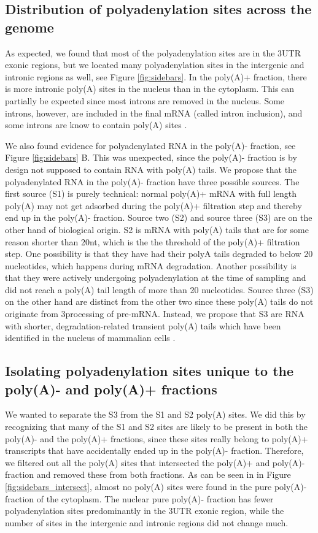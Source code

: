 \subsection{Distribution of polyadenylation sites across the genome}
As expected, we found that most of the polyadenylation sites are in the 3\p UTR
exonic regions, but we located many polyadenylation sites in the intergenic
and intronic regions as well, see Figure \ref{fig:sidebars}. In the poly(A)+
fraction, there is more intronic poly(A) sites in the nucleus than in the
cytoplasm. This can partially be expected since most introns are removed in the
nucleus. Some introns, however, are included in the final mRNA (called intron
inclusion), and some introns are know to contain poly(A) sites
\cite{tian_widespread_2007}. 

We also found evidence for polyadenylated RNA in the poly(A)- fraction, see
Figure \ref{fig:sidebars} B. This was unexpected, since the poly(A)- fraction
is by design not supposed to contain RNA with poly(A) tails. We propose that
the polyadenylated RNA in the poly(A)- fraction have three possible sources.
The first source (S1) is purely technical: normal poly(A)+ mRNA with full
length poly(A) may not get adsorbed during the poly(A)+ filtration step and
thereby end up in the poly(A)- fraction. Source two (S2) and source three (S3)
are on the other hand of biological origin. S2 is mRNA with poly(A) tails that
are for some reason shorter than 20nt, which is the the threshold of the
poly(A)+ filtration step. One possibility is that they have had their polyA
tails degraded to below 20 nucleotides, which happens during mRNA degradation.
Another possibility is that they were actively undergoing polyadenylation at
the time of sampling and did not reach a poly(A) tail length of more than 20
nucleotides. Source three (S3) on the other hand are distinct from the other
two since these poly(A) tails do not originate from 3\p processing of pre-mRNA.
Instead, we propose that S3 are RNA with shorter, degradation-related transient
poly(A) tails which have been identified in the nucleus of mammalian cells
\cite{lemay_nuclear_2010}.

\subsection{Isolating polyadenylation sites unique to the poly(A)- and poly(A)+
fractions}
We wanted to separate the S3 from the S1 and S2 poly(A) sites. We did this by
recognizing that many of the S1 and S2 sites are likely to be present in both
the poly(A)- and the poly(A)+ fractions, since these sites really belong to
poly(A)+ transcripts that have accidentally ended up in the poly(A)- fraction.
Therefore, we filtered out all the poly(A) sites that intersected the poly(A)+
and poly(A)- fraction and removed these from both fractions. As can be seen in
in Figure \ref{fig:sidebars_intersect}, almost no poly(A) sites were found in
the pure poly(A)- fraction of the cytoplasm. The nuclear pure poly(A)- fraction
has fewer polyadenylation sites predominantly in the 3UTR exonic region, while
the number of sites in the intergenic and intronic regions did not change much.

